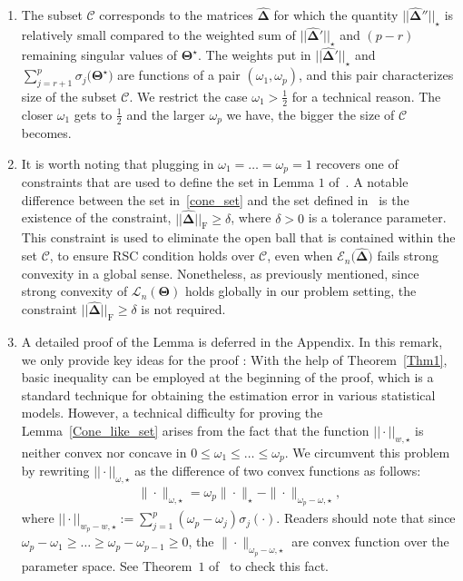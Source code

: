 \documentclass[12pt]{article}
\begin{document}
\begin{enumerate}
    \item The subset $\mathcal{C}$ corresponds to the matrices $\boldsymbol{\widehat{\Delta}}$ for which the quantity $||\boldsymbol{\widehat{\Delta}}''||_{\star}$ is relatively small compared to the weighted sum of $||\boldsymbol{\widehat{\Delta}}'||_{\star}$ and $(p-r)$ remaining singular values of $\boldsymbol{\Theta}^{\star}$.
    The weights put in $||\boldsymbol{\widehat{\Delta}}'||_{\star}$ and $\sum_{j=r+1}^{p}\sigma_{j}\big(\boldsymbol{\Theta^{\star}}\big)$ are functions of a pair $(\omega_{1},\omega_{p})$, and this pair characterizes size of the subset $\mathcal{C}$.
    We restrict the case $\omega_{1} > \frac{1}{2}$ for a technical reason.
    The closer $\omega_{1}$ gets to $\frac{1}{2}$ and the larger $\omega_{p}$ we have, the bigger the size of $\mathcal{C}$  becomes.
    
    \item It is worth noting that plugging in $\omega_{1}=\dots=\omega_{p}=1$ recovers one of constraints that are used to define the set in Lemma $1$ of~\citet{negahban2011estimation}.
    A notable difference between the set in~\eqref{cone_set} and the set defined in~\citet{negahban2011estimation} is the existence of the constraint, $||\boldsymbol{\widehat{\Delta}}||_{\text{F}} \geq \delta$, where $\delta>0$ is a tolerance parameter.
    This constraint is used to eliminate the open ball that is contained within the set $\mathcal{C}$, to ensure RSC condition holds over $\mathcal{C}$, even when $\mathcal{E}_{n}\big(\boldsymbol{\widehat{\Delta}})$ fails strong convexity in a global sense. 
    Nonetheless, as previously mentioned, since strong convexity of $\mathcal{L}_{n}(\boldsymbol{\Theta})$ holds globally in our problem setting, the constraint $||\boldsymbol{\widehat{\Delta}}||_{\text{F}} \geq \delta$ is not required.
    
    \item A detailed proof of the Lemma is deferred in the Appendix.
    In this remark, we only provide key ideas for the proof :
    With the help of Theorem~\ref{Thm1}, basic inequality can be employed at the beginning of the proof,
    which is a standard technique for obtaining the estimation error in various statistical models.
    However, a technical difficulty for proving the Lemma~\ref{Cone_like_set} arises from the fact that the function $|| \cdot ||_{w,\star}$ is neither convex nor concave in $0\leq \omega_{1}\leq\dots \leq \omega_{p}$.
    We circumvent this problem by rewriting $|| \cdot ||_{\omega,\star}$ as the difference of two convex functions as follows: 
    \begin{align*}
        \| \cdot \|_{\omega,\star} = \omega_{p} \| \cdot \|_{\star} - \| \cdot \|_{\omega_{p}-\omega,\star},
    \end{align*}
    where $|| \cdot ||_{w_{p}-w,\star}:=\sum_{j=1}^{p}(\omega_{p}-\omega_{j})\sigma_{j}(\cdot)$.
    Readers should note that since $\omega_{p}-\omega_{1} \geq \dots \geq \omega_{p}-\omega_{p-1}\geq 0$, the $\| \cdot \|_{\omega_{p}-\omega,\star}$ are convex function over the parameter space.
    See Theorem~$1$ of~\cite{chen2013reduced} to check this fact.
\end{enumerate}
\end{document}
